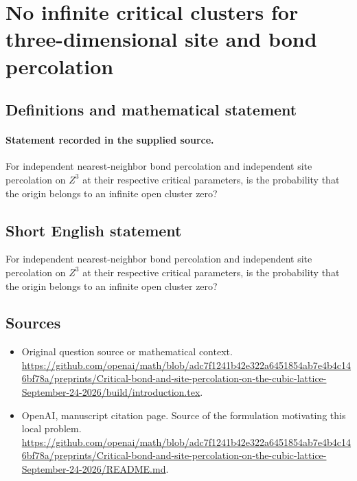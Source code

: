 \documentclass[11pt]{article}
\begin{document}
\section*{No infinite critical clusters for three-dimensional site and bond percolation}\label{statement}
\subsection{Definitions and mathematical statement}
\paragraph{Statement recorded in the supplied source.}
For independent nearest-neighbor bond percolation and independent site percolation on $Z^3$ at their respective critical parameters, is the probability that the origin belongs to an infinite open cluster zero?
\subsection{Short English statement}
For independent nearest-neighbor bond percolation and independent site percolation on $Z^3$ at their respective critical parameters, is the probability that the origin belongs to an infinite open cluster zero?
\subsection{Sources}
\begin{itemize}
\item[S1] Original question source or mathematical context.
\url{https://github.com/openai/math/blob/adc7f1241b42e322a6451854ab7e4b4c146bf78a/preprints/Critical-bond-and-site-percolation-on-the-cubic-lattice-September-24-2026/build/introduction.tex}.
\item[S2] OpenAI, manuscript citation page. Source of the formulation motivating this local problem.
\url{https://github.com/openai/math/blob/adc7f1241b42e322a6451854ab7e4b4c146bf78a/preprints/Critical-bond-and-site-percolation-on-the-cubic-lattice-September-24-2026/README.md}.
\end{itemize}
\end{document}
